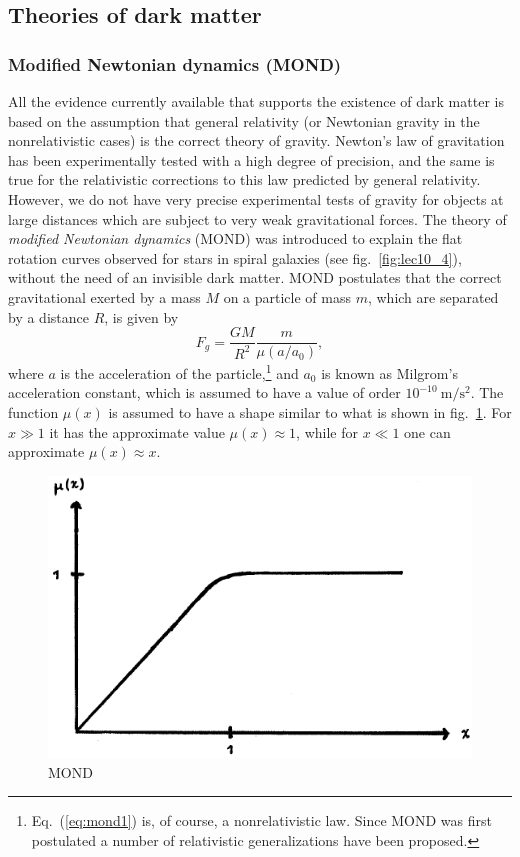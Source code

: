 \documentclass[11pt, a4paper,oneside,openright]{book}
\numberwithin{equation}{section}
\begin{document}
\subsection{Theories of dark matter}

\subsubsection{Modified Newtonian dynamics (MOND)}

All the evidence currently available that supports the existence of dark matter is based on the assumption that general relativity (or Newtonian gravity in the nonrelativistic cases) is the correct theory of gravity. Newton's law of gravitation has been experimentally tested with a high degree of precision, and the same is true for the relativistic corrections to this law predicted by general relativity. However, we do not have very precise experimental tests of gravity for objects at large distances which are subject to very weak gravitational forces. The theory of {\it modified Newtonian dynamics} (MOND) was introduced to explain the flat rotation curves observed for stars in spiral galaxies (see fig.\ \ref{fig:lec10_4}), without the need of an invisible dark matter. MOND postulates that the correct gravitational exerted by a mass $M$ on a particle of mass $m$, which are separated by a distance $R$, is given by
\begin{equation} \label{eq:mond1}
F_g=\frac{GM}{R^2}\frac{m}{\mu(a/a_0)},
\end{equation}
where $a$ is the acceleration of the particle,\footnote{Eq.\ (\ref{eq:mond1}) is, of course, a nonrelativistic law. Since MOND was first postulated a number of relativistic generalizations have been proposed.} and $a_0$ is known as Milgrom's acceleration constant, which is assumed to have a value of order $10^{-10}~\mathrm{m/s^2}$. The function $\mu(x)$ is assumed to have a shape similar to what is shown in fig.\ \ref{fig:lec10_9}. For $x\gg1$ it has the approximate value $\mu(x)\approx1$, while for $x\ll1$ one can approximate $\mu(x)\approx x$.
\begin{figure}[ht]
\begin{center}
\includegraphics[scale=0.6]{Draw/lec10_9.png}
\end{center}
\caption{MOND}
\label{fig:lec10_9}
\end{figure}
\end{document}
